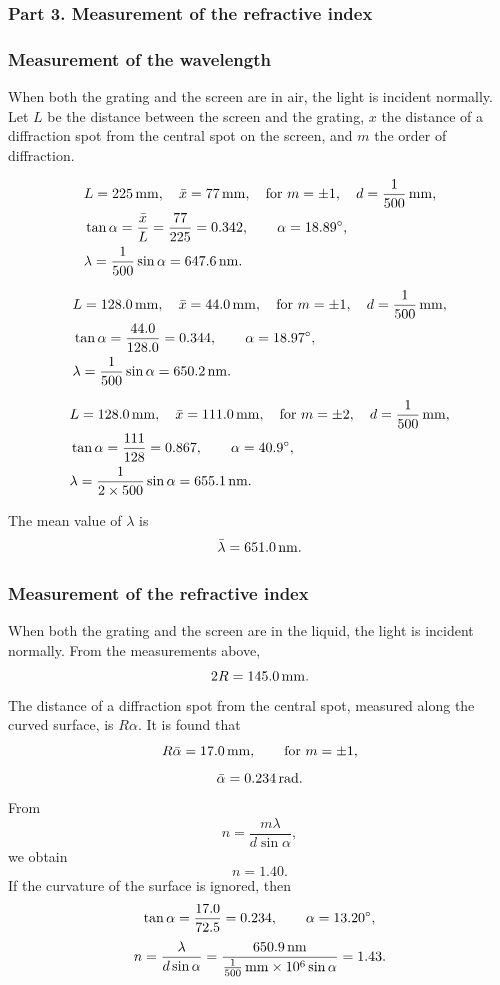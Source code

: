 \subsubsection*{Part 3. Measurement of the refractive index}

\subsubsection*{Measurement of the wavelength}

When both the grating and the screen are in air, the light is incident normally. Let $L$ be the distance between the screen and the grating, $x$ the distance of a diffraction spot from the central spot on the screen, and $m$ the order of diffraction.

\begin{align*}
&L=225\,\mathrm{mm},\quad \bar{x}=77\,\mathrm{mm},\quad \text{for }m=\pm1,\quad d=\frac{1}{500}\,\mathrm{mm},\\
&\tan\alpha=\frac{\bar{x}}{L}=\frac{77}{225}=0.342,\qquad \alpha=18.89^{\circ},\\
&\lambda=\frac{1}{500}\sin\alpha=647.6\,\mathrm{nm}.
\end{align*}

\begin{align*}
&L=128.0\,\mathrm{mm},\quad \bar{x}=44.0\,\mathrm{mm},\quad \text{for }m=\pm1,\quad d=\frac{1}{500}\,\mathrm{mm},\\
&\tan\alpha=\frac{44.0}{128.0}=0.344,\qquad \alpha=18.97^{\circ},\\
&\lambda=\frac{1}{500}\sin\alpha=650.2\,\mathrm{nm}.
\end{align*}

\begin{align*}
&L=128.0\,\mathrm{mm},\quad \bar{x}=111.0\,\mathrm{mm},\quad \text{for }m=\pm2,\quad d=\frac{1}{500}\,\mathrm{mm},\\
&\tan\alpha=\frac{111}{128}=0.867,\qquad \alpha=40.9^{\circ},\\
&\lambda=\frac{1}{2\times500}\sin\alpha=655.1\,\mathrm{nm}.
\end{align*}

The mean value of $\lambda$ is
\[
\bar{\lambda}=651.0\,\mathrm{nm}.
\]

\subsubsection*{Measurement of the refractive index}

When both the grating and the screen are in the liquid, the light is incident normally. From the measurements above,
\[
2R=145.0\,\mathrm{mm}.
\]
The distance of a diffraction spot from the central spot, measured along the curved surface, is $R\alpha$. It is found that
\[
R\bar{\alpha}=17.0\,\mathrm{mm},\qquad\text{for }m=\pm1,
\]
\[
\bar{\alpha}=0.234\,\mathrm{rad}.
\]
From
\[
n=\frac{m\lambda}{d\sin\alpha},
\]
we obtain
\[
n=1.40.
\]
If the curvature of the surface is ignored, then
\[
\tan\alpha=\frac{17.0}{72.5}=0.234,\qquad \alpha=13.20^{\circ},
\]
\[
n=\frac{\lambda}{d\sin\alpha}
=\frac{650.9\,\mathrm{nm}}{\frac{1}{500}\,\mathrm{mm}\times10^{6}\sin\alpha}=1.43.
\]
